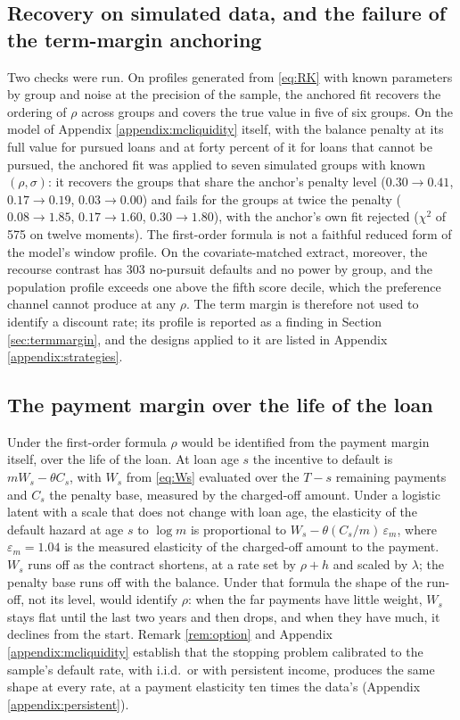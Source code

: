 \subsection{Recovery on simulated data, and the failure of the term-margin anchoring}
Two checks were run. On profiles generated from \eqref{eq:RK} with known parameters by group and noise at the precision of the sample, the anchored fit recovers the ordering of $\rho$ across groups and covers the true value in five of six groups. On the model of Appendix \ref{appendix:mcliquidity} itself, with the balance penalty at its full value for pursued loans and at forty percent of it for loans that cannot be pursued, the anchored fit was applied to seven simulated groups with known $(\rho, \sigma)$: it recovers the groups that share the anchor's penalty level ($0.30 \to 0.41$, $0.17 \to 0.19$, $0.03 \to 0.00$) and fails for the groups at twice the penalty ($0.08 \to 1.85$, $0.17 \to 1.60$, $0.30 \to 1.80$), with the anchor's own fit rejected ($\chi^2$ of 575 on twelve moments). The first-order formula is not a faithful reduced form of the model's window profile. On the covariate-matched extract, moreover, the recourse contrast has 303 no-pursuit defaults and no power by group, and the population profile exceeds one above the fifth score decile, which the preference channel cannot produce at any $\rho$. The term margin is therefore not used to identify a discount rate; its profile is reported as a finding in Section \ref{sec:termmargin}, and the designs applied to it are listed in Appendix \ref{appendix:strategies}.

\subsection{The payment margin over the life of the loan}\label{appendix:runoff}
Under the first-order formula $\rho$ would be identified from the payment margin itself, over the life of the loan. At loan age $s$ the incentive to default is $m W_s - \theta C_s$, with $W_s$ from \eqref{eq:Ws} evaluated over the $T - s$ remaining payments and $C_s$ the penalty base, measured by the charged-off amount. Under a logistic latent with a scale that does not change with loan age, the elasticity of the default hazard at age $s$ to $\log m$ is proportional to $W_s - \theta (C_s/m)\,\varepsilon_m$, where $\varepsilon_m = 1.04$ is the measured elasticity of the charged-off amount to the payment. $W_s$ runs off as the contract shortens, at a rate set by $\rho + h$ and scaled by $\lambda$; the penalty base runs off with the balance. Under that formula the shape of the run-off, not its level, would identify $\rho$: when the far payments have little weight, $W_s$ stays flat until the last two years and then drops, and when they have much, it declines from the start. Remark \ref{rem:option} and Appendix \ref{appendix:mcliquidity} establish that the stopping problem calibrated to the sample's default rate, with i.i.d.\ or with persistent income, produces the same shape at every rate, at a payment elasticity ten times the data's (Appendix \ref{appendix:persistent}).

